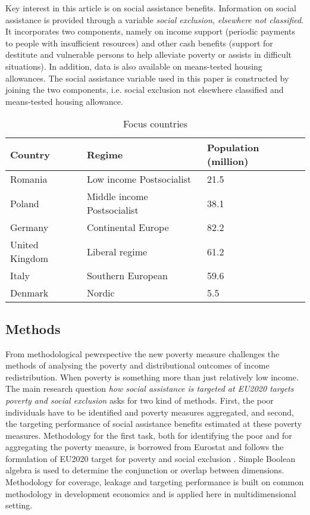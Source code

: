 \documentclass[11pt, a4paper]{article}\usepackage{graphicx, color}
\begin{document}
Key interest in this article is on social assistance benefits. Information on social assistance is provided through a variable \textit{social exclusion, elsewhere not classified}. It incorporates two components, namely on income support (periodic payments to people with insufficient resources) and other cash benefits (support for destitute and vulnerable persons to help alleviate poverty or assists in difficult situations). In addition, data is also available on means-tested housing allowances. The social assistance variable used in this paper is constructed by joining the two components, i.e. social exclusion not elsewhere classified and means-tested housing allowance.

\begin{table}[H]
\begin{center}
\caption{Focus countries}
{\footnotesize
\begin{tabular}{p{3cm}p{3cm}p{2cm}}
  \toprule
  \textbf{Country} & \textbf{Regime} &  \textbf{Population (million)} \\ \midrule
  Romania & Low income Postsocialist & 21.5  \\
  Poland & Middle income Postsocialist & 38.1\\
  Germany & Continental Europe & 82.2 \\
  United Kingdom & Liberal regime & 61.2 \\
  Italy & Southern European &  59.6\\
  Denmark & Nordic & 5.5\\
 \bottomrule
 \end{tabular}
}
\end{center}
\end{table}


\subsection{Methods}

From methodological pewrspective the new poverty measure challenges the  methods of analysing the poverty and distributional outcomes of income redistribution. When poverty is something more than just relatively low income. The main research question \emph{how social assistance is targeted at EU2020 targets poverty and social exclusion} asks for two kind of methods. 
First, the poor individuals have to be identified and poverty measures aggregated, and 
second, the targeting performance of social assistance benefits estimated at these poverty measures. Methodology for the first task, both for identifying the poor and for aggregating the poverty measure, is borrowed from Eurostat and follows the formulation of EU2020 target for poverty and social exclusion \citep{atkinson_income_2010}. Simple Boolean algebra is used to determine the conjunction or overlap between dimensions. Methodology for coverage, leakage and targeting performance is built on common methodology in development economics \citep[primarily][]{coady_targeting_2004} and is applied here in multidimensional setting. 
\end{document}
